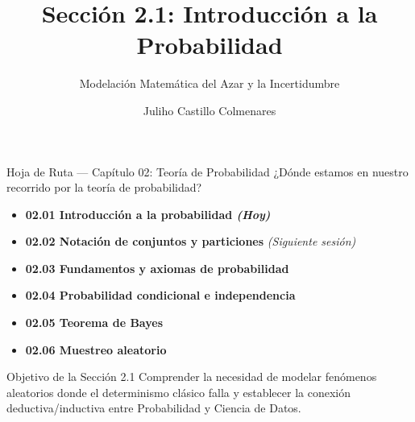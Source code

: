 


\title[Introducción a la Probabilidad]{Sección 2.1: Introducción a la Probabilidad}
\subtitle{Modelación Matemática del Azar y la Incertidumbre}
\author[J. Castillo Colmenares]{Juliho Castillo Colmenares}
\date{}



\begin{frame}[plain]
  \titlepage
\end{frame}

\begin{frame}{Hoja de Ruta — Capítulo 02: Teoría de Probabilidad}
  ¿Dónde estamos en nuestro recorrido por la teoría de probabilidad? \pause
  \begin{itemize}
    \item \color{TecRojo}\textbf{02.01 Introducción a la probabilidad \emph{(Hoy)}}\color{black} \pause
    \item \textbf{02.02 Notación de conjuntos y particiones} \emph{(Siguiente sesión)} \pause
    \item \textbf{02.03 Fundamentos y axiomas de probabilidad} \pause
    \item \textbf{02.04 Probabilidad condicional e independencia} \pause
    \item \textbf{02.05 Teorema de Bayes} \pause
    \item \textbf{02.06 Muestreo aleatorio}
  \end{itemize}
  \vspace{0.8em}
  \begin{block}{Objetivo de la Sección 2.1}
    Comprender la necesidad de modelar fenómenos aleatorios donde el determinismo clásico falla y establecer la conexión deductiva/inductiva entre Probabilidad y Ciencia de Datos.
  \end{block}
\end{frame}

